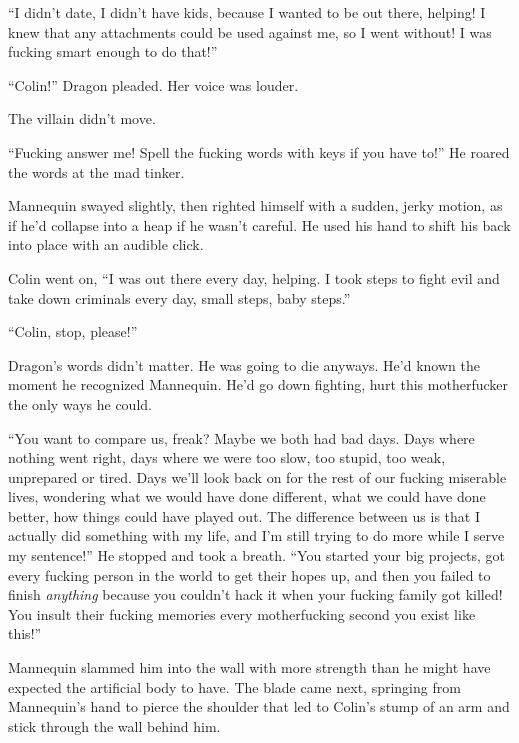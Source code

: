 ``I didn't date, I didn't have kids, because I wanted to be out there, helping!  I knew that any attachments could be used against me, so I went without!  I was fucking smart enough to do that!''



``Colin!''  Dragon pleaded.  Her voice was louder.



The villain didn't move.



``Fucking answer me!  Spell the fucking words with keys if you have to!''  He roared the words at the mad tinker.



Mannequin swayed slightly, then righted himself with a sudden, jerky motion, as if he'd collapse into a heap if he wasn't careful.  He used his hand to shift his back into place with an audible click.



Colin went on, ``I was out there every day, helping.  I took steps to fight evil and take down criminals every day, small steps, baby steps.''



``Colin, stop, please!''



Dragon's words didn't matter.  He was going to die anyways.  He'd known the moment he recognized Mannequin.  He'd go down fighting, hurt this motherfucker the only ways he could.



``You want to compare us, freak?  Maybe we both had bad days.  Days where nothing went right, days where we were too slow, too stupid, too weak, unprepared or tired.  Days we'll look back on for the rest of our fucking miserable lives, wondering what we would have done different, what we could have done better, how things could have played out.  The difference between us is that I actually did something with my life, and I'm still trying to do more while I serve my sentence!''  He stopped and took a breath.  ``You started your big projects, got every fucking person in the world to get their hopes up, and then you failed to finish \emph{anything} because you couldn't hack it when your fucking family got killed!  You insult their fucking memories every motherfucking second you exist like this!''



Mannequin slammed him into the wall with more strength than he might have expected the artificial body to have.  The blade came next, springing from Mannequin's hand to pierce the shoulder that led to Colin's stump of an arm and stick through the wall behind him.



